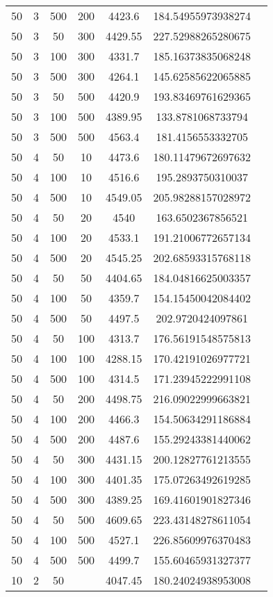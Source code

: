 {\begin{longtabu}{S
S
S
S
S
S[round-mode=places,round-precision=0]
S[round-mode=places,round-precision=0]}
50 & 3 & 500 & 200 & 4423.6 & 184.54955973938274 \\
50 & 3 & 50 & 300 & 4429.55 & 227.52988265280675 \\
50 & 3 & 100 & 300 & 4331.7 & 185.16373835068248 \\
50 & 3 & 500 & 300 & 4264.1 & 145.62585622065885 \\
50 & 3 & 50 & 500 & 4420.9 & 193.83469761629365 \\
50 & 3 & 100 & 500 & 4389.95 & 133.8781068733794 \\
50 & 3 & 500 & 500 & 4563.4 & 181.4156553332705 \\
50 & 4 & 50 & 10 & 4473.6 & 180.11479672697632 \\
50 & 4 & 100 & 10 & 4516.6 & 195.2893750310037 \\
50 & 4 & 500 & 10 & 4549.05 & 205.98288157028972 \\
50 & 4 & 50 & 20 & 4540 & 163.6502367856521 \\
50 & 4 & 100 & 20 & 4533.1 & 191.21006772657134 \\
50 & 4 & 500 & 20 & 4545.25 & 202.68593315768118 \\
50 & 4 & 50 & 50 & 4404.65 & 184.04816625003357 \\
50 & 4 & 100 & 50 & 4359.7 & 154.15450042084402 \\
50 & 4 & 500 & 50 & 4497.5 & 202.9720424097861 \\
50 & 4 & 50 & 100 & 4313.7 & 176.56191548575813 \\
50 & 4 & 100 & 100 & 4288.15 & 170.42191026977721 \\
50 & 4 & 500 & 100 & 4314.5 & 171.23945222991108 \\
50 & 4 & 50 & 200 & 4498.75 & 216.09022999663821 \\
50 & 4 & 100 & 200 & 4466.3 & 154.50634291186884 \\
50 & 4 & 500 & 200 & 4487.6 & 155.29243381440062 \\
50 & 4 & 50 & 300 & 4431.15 & 200.12827761213555 \\
50 & 4 & 100 & 300 & 4401.35 & 175.07263492619285 \\
50 & 4 & 500 & 300 & 4389.25 & 169.41601901827346 \\
50 & 4 & 50 & 500 & 4609.65 & 223.43148278611054 \\
50 & 4 & 100 & 500 & 4527.1 & 226.85609976370483 \\
50 & 4 & 500 & 500 & 4499.7 & 155.60465931327377 \\
10 & 2 & 50 & & 4047.45 & 180.24024938953008 \\

\end{longtabu}}
